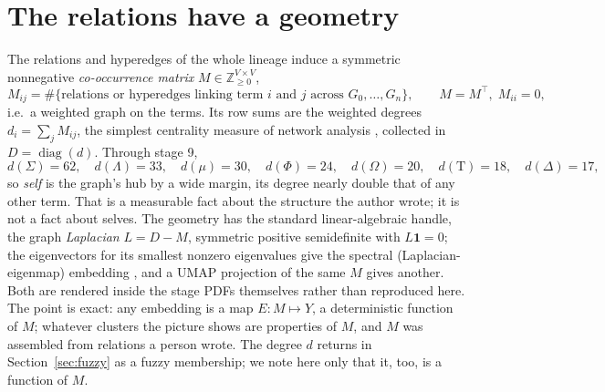 \documentclass[11pt]{article}
\newcommand{\Tau}{\mathrm{T}}
\begin{document}
\section{The relations have a geometry}\label{sec:geom}
The relations and hyperedges of the whole lineage induce a symmetric nonnegative
\emph{co-occurrence matrix} $M\in\mathbb{Z}_{\ge0}^{V\times V}$,
\begin{equation}
M_{ij}=\#\{\text{relations or hyperedges linking term }i\text{ and }j\text{ across }
G_0,\dots,G_n\},\qquad M=M^{\!\top},\;M_{ii}=0,
\end{equation}
i.e.\ a weighted graph on the terms. Its row sums are the weighted degrees
$d_i=\sum_j M_{ij}$, the simplest centrality measure of network analysis
\cite{freeman}, collected in $D=\operatorname{diag}(d)$. Through stage 9,
\begin{equation}
d(\Sigma)=62,\quad d(\Lambda)=33,\quad d(\mu)=30,\quad d(\Phi)=24,\quad
d(\Omega)=20,\quad d(\Tau)=18,\quad d(\Delta)=17,
\end{equation}
so \emph{self} is the graph's hub by a wide margin, its degree nearly double that
of any other term. That is a measurable fact about the structure the author wrote;
it is not a fact about selves. The geometry has the standard linear-algebraic
handle, the graph \emph{Laplacian} $L=D-M$, symmetric positive semidefinite with
$L\mathbf{1}=0$; the eigenvectors for its smallest nonzero eigenvalues give the
spectral (Laplacian-eigenmap) embedding \cite{laplacian}, and a UMAP projection
\cite{umap} of the same $M$ gives another. Both are rendered inside the stage PDFs
themselves rather than reproduced here. The point is exact: any embedding is a map
$E:M\mapsto Y$, a deterministic function of $M$; whatever clusters the picture
shows are properties of $M$, and $M$ was assembled from relations a person wrote.
The degree $d$ returns in Section~\ref{sec:fuzzy} as a fuzzy membership; we note
here only that it, too, is a function of $M$.
\end{document}
